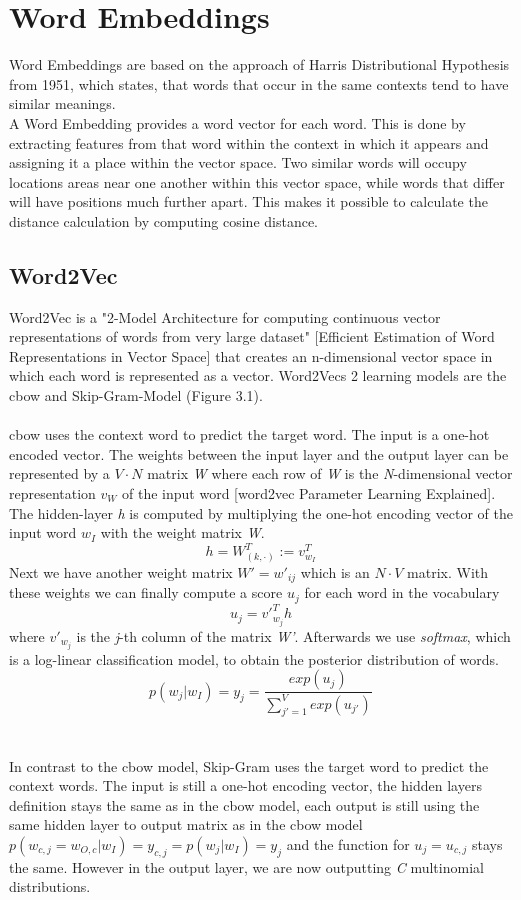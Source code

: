 \documentclass[a4paper, 11pt,titlepage,oneside,openany]{book}
\begin{document}
\section{Word Embeddings}
Word Embeddings are based on the approach of Harris Distributional Hypothesis from 1951, which states, that words that occur in the same contexts tend to have similar meanings. \\
\noindent A Word Embedding provides a word vector for each word. This is done by extracting features from that word within the context in which it appears and assigning it a place within the vector space. Two similar words will occupy locations areas near one another within this vector space, while words that differ will have positions much further apart. This makes it possible to calculate the distance calculation by computing cosine distance.
\subsection{Word2Vec}
Word2Vec is a "2-Model Architecture for computing continuous vector representations of words from very large dataset" [Efficient Estimation of Word Representations in Vector Space] that creates an n-dimensional vector space in which each word is represented as a vector. Word2Vecs 2 learning models are the \gls{cbow} and Skip-Gram-Model (Figure 3.1).\\
\\
\noindent \gls{cbow} uses the context word to predict the target word. The input is a one-hot encoded vector. The weights between the input layer and the output layer can be represented by a $V \cdot N$ matrix \textit{W} where each row of \textit{W} is the \textit{N}-dimensional vector representation $v_W$ of the input word [word2vec Parameter Learning Explained]. The hidden-layer \textit{h} is computed by multiplying the one-hot encoding vector of the input word $w_I$ with the weight matrix \textit{W}.
\[
h=W_{(k, \cdot)}^{T}:=v_{w_I}^{T}
\] 
Next we have another weight matrix $W'={w'_{ij}}$ which is an $N \cdot V$ matrix. With these weights we can finally compute a score $u_j$ for each word in the vocabulary
\[
u_{j}={v'}_{w_j}^{T}h
\] where ${v'}_{w_j}$ is the \textit{j}-th column of the matrix \textit{W'}. Afterwards we use \textit{softmax}, which is a log-linear classification model, to obtain the posterior distribution of words.
\[
p(w_j|w_I)=y_j=\frac{exp(u_j)}{\sum_{j'=1}^V exp(u_{j'})}
\] \\
\\
\noindent In contrast to the \gls{cbow} model,  Skip-Gram uses the target word to predict the context words. The input is still a one-hot encoding vector, the hidden layers definition stays the same as in the \gls{cbow} model, each output is still using the same hidden layer to output matrix as in the \gls{cbow} model $p(w_{c,j}=w_{O,c}|w_I)=y_{c,j} = p(w_j|w_I)=y_j$ and the function for $u_j=u_{c,j}$ stays the same. However in the output layer, we are now outputting \textit{C} multinomial distributions. 
\end{document}
